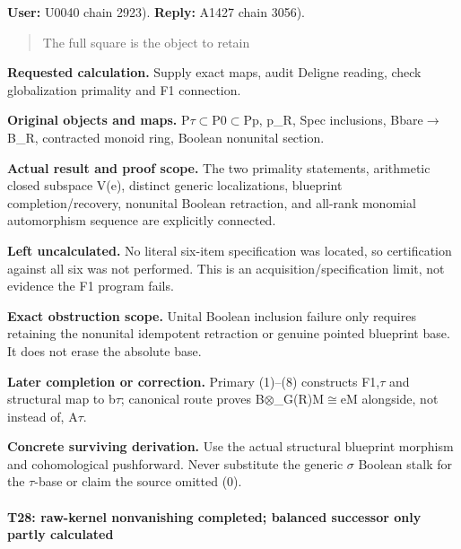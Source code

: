 \textbf{User:} U0040
\protect{} chain 2923).
\textbf{Reply:} A1427
\protect{} chain 3056).

\begin{quote}
The full square is the object to retain
\end{quote}

\textbf{Requested calculation.} Supply exact maps, audit Deligne
reading, check globalization primality and F1 connection.

\textbf{Original objects and maps.}
P\allowbreak{}\ensuremath{τ}\allowbreak{}\allowbreak{}\ensuremath{⊂}\allowbreak{}P0\allowbreak{}\ensuremath{⊂}\allowbreak{}Pp,
p\_R, Spec inclusions,
Bbare\allowbreak{}\ensuremath{→}\allowbreak{}B\_R, contracted monoid
ring, Boolean nonunital section.

\textbf{Actual result and proof scope.} The two primality statements,
arithmetic closed subspace V(e), distinct generic localizations,
blueprint completion/recovery, nonunital Boolean retraction, and
all-rank monomial automorphism sequence are explicitly connected.

\textbf{Left uncalculated.} No literal six-item specification was
located, so certification against all six was not performed. This is an
acquisition/specification limit, not evidence the F1 program fails.

\textbf{Exact obstruction scope.} Unital Boolean inclusion failure only
requires retaining the nonunital idempotent retraction or genuine
pointed blueprint base. It does not erase the absolute base.

\textbf{Later completion or correction.} Primary (1)--(8) constructs
F1,\allowbreak{}\ensuremath{τ}\allowbreak{} and structural map to
b\allowbreak{}\ensuremath{τ}\allowbreak{}; canonical route proves
B\allowbreak{}\ensuremath{⊗}\allowbreak{}\_G(R)M\allowbreak{}\ensuremath{≅}\allowbreak{}eM
alongside, not instead of, A\allowbreak{}\ensuremath{τ}\allowbreak{}.

\textbf{Concrete surviving derivation.} Use the actual structural
blueprint morphism and cohomological pushforward. Never substitute the
generic \allowbreak{}\ensuremath{σ}\allowbreak{} Boolean stalk for the
\allowbreak{}\ensuremath{τ}\allowbreak{}-base or claim the source
omitted (0).

\paragraph{T28: raw-kernel nonvanishing completed; balanced successor
only partly
calculated}\label{t28-raw-kernel-nonvanishing-completed-balanced-successor-only-partly-calculated}

